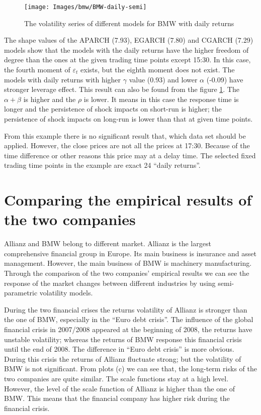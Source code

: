\begin{figure}[!htbp]
	\centering
	\texttt{[image: Images/bmw/BMW-daily-semi]}
	\caption[The volatility series of different models for BMW with daily returns]{The volatility series of different models for BMW with daily returns}
	\label{fig:BMWdailysemi}
\end{figure}


The shape values of the APARCH (7.93), EGARCH (7.80) and CGARCH (7.29) models show that the models with the daily returns have the higher freedom of degree than the ones at the given trading time points except 15:30. In this case, the fourth moment of $\varepsilon_t$ exists, but the eighth moment does not exist. The models with daily returns with higher $\gamma$ value (0.93) and lower $\alpha$ (-0.09) have stronger leverage effect. This result can also be found from the figure \ref{fig:BMWdailysemi}. The $\alpha + \beta$ is higher and the $\rho$ is lower. It means in this case the response time is longer and the persistence of shock impacts on short-run is higher; the persistence of shock impacts on long-run is lower than that at given time points.


From this example there is no significant result that, which data set should be applied. However, the close prices are not all the prices at 17:30. Because of the time difference or other reasons this price may at a delay time. The selected fixed trading time points in the example are exact 24 ``daily returns''.



\section{Comparing the empirical results of the two companies}

Allianz and BMW belong to different market. Allianz is the largest comprehensive financial group in Europe. Its main business is insurance and asset management. However, the main business of BMW is machinery manufacturing. Through the comparison of the two companies' empirical results we can see the response of the market changes between different industries by using semi-parametric volatility models.

During the two financial crises the returns volatility of Allianz is stronger than the one of BMW, especially in the ``Euro debt crisis''. The influence of the global financial crisis in 2007/2008 appeared at the beginning of 2008, the returns have unstable volatility; whereas the returns of BMW response this financial crisis until the end of 2008. The difference in ``Euro debt crisis'' is more obvious. During this crisis the returns of Allianz fluctuate strong; but the volatility of BMW is not significant. From plots (c) we can see that, the long-term risks of the two companies are quite similar. The scale functions stay at a high level. However, the level of the scale function of Allianz is higher than the one of BMW. This means that the financial company has higher risk during the financial crisis.

